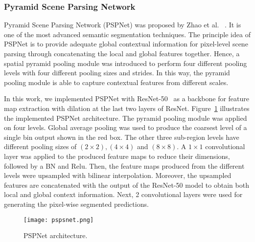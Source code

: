 \subsubsection{Pyramid Scene Parsing Network}
Pyramid Scene Parsing Network (PSPNet) was proposed by Zhao et al.~\cite{zhao2017pyramid} .
It is one of the most advanced semantic segmentation techniques. 
The principle idea of PSPNet is to provide adequate global contextual information for pixel-level scene parsing through concatenating the local and global features together. 
Hence, a spatial pyramid pooling module was introduced to perform four different pooling levels with four different pooling sizes and strides.
In this way, the pyramid pooling module is able to capture contextual features from different scales.

In this work, we implemented PSPNet with ResNet-50~\cite{He2016} as a backbone for feature map extraction with dilation at the last two layers of ResNet. 
Figure~\ref{fig:PSPNet} illustrates the implemented PSPNet architecture.
The pyramid pooling module was applied on four levels.
Global average pooling was used to produce the coarsest level of a single bin output shown in the red box. 
The other three sub-region levels have different pooling sizes of \((2\times 2), (4\times 4)\) and \((8\times8)\).
A \(1 \times 1\) convolutional layer was applied to the produced feature maps to reduce their dimensions, followed by a BN and Relu.
Then, the feature maps produced from the different levels were upsampled with bilinear interpolation.
Moreover, the upsampled features are concatenated with the output of the ResNet-50 model to obtain both local and global context information. 
Next, 2 convolutional layers were used for generating the pixel-wise segmented predictions. 
\begin{figure} [h!]
	\centering
	\texttt{[image: pspsnet.png]}
	\caption{PSPNet architecture.} 
	\label{fig:PSPNet}
\end{figure} 
